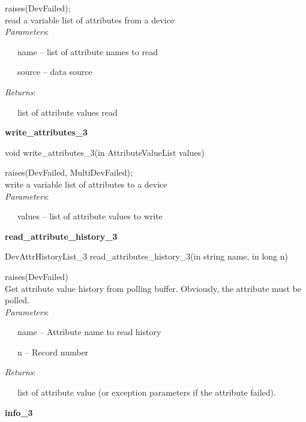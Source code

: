 raises(DevFailed);\\


read a variable list of attributes from a device\\


\emph{Parameters}:

~~~name -- list of attribute names to read

~~~source -- data source

\emph{Returns}:

~~~list of attribute values read \textbf{}\\


\begin{flushleft}
\textbf{write\_attributes\_3}
\par\end{flushleft}

void write\_attributes\_3(in AttributeValueList values)

raises(DevFailed, MultiDevFailed);\\


write a variable list of attributes to a device\\


\emph{Parameters}:

~~~values -- list of attribute values to write\\


\begin{flushleft}
\textbf{read\_attribute\_history\_3}
\par\end{flushleft}

DevAttrHistoryList\_3 read\_attributes\_history\_3(in string name,
in long n)

raises(DevFailed)\\


Get attribute value history from polling buffer. Obviously, the attribute
must be polled.\\


\emph{Parameters}:

~~~name -- Attribute name to read history

~~~n -- Record number

\emph{Returns}:

~~~list of attribute value (or exception parameters if the attribute
failed).\\


\begin{flushleft}
\textbf{info\_3}
\par\end{flushleft}

